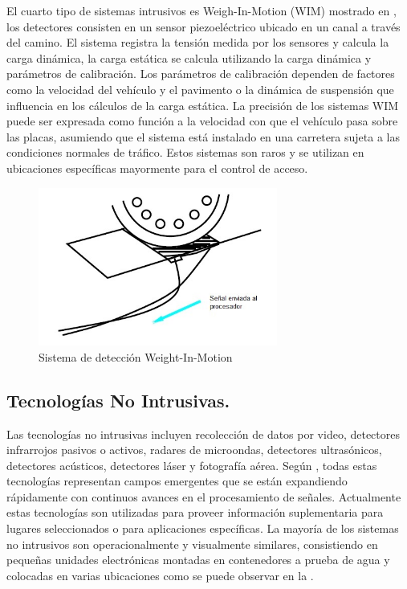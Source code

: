 El cuarto tipo de sistemas intrusivos es Weigh-In-Motion (WIM) mostrado en , los detectores consisten en un sensor piezoeléctrico ubicado en un canal a través del camino. El sistema registra la tensión medida por los sensores y calcula la carga dinámica, la carga estática se calcula utilizando la carga dinámica y parámetros de calibración. Los parámetros de calibración dependen de factores como la velocidad del vehículo y el pavimento o la dinámica de suspensión que influencia en los cálculos de la carga estática. La precisión de los sistemas WIM puede ser expresada como función a la velocidad con que el vehículo pasa sobre las placas, asumiendo que el sistema está instalado en una carretera sujeta a las condiciones normales de tráfico. Estos sistemas son raros y se utilizan en ubicaciones específicas mayormente para el control de acceso.

\begin{figure}[h]
	\centering
	\includegraphics[width=0.7\textwidth]{capitulos/3/figuras/figura2.jpg}
	\caption{\label{fig:Weight-In-Motion}  Sistema de detección Weight-In-Motion}	
\end{figure}

\subsection{Tecnologías No Intrusivas.}

Las tecnologías no intrusivas incluyen recolección de datos por video, detectores infrarrojos pasivos o activos, radares de microondas, detectores ultrasónicos, detectores acústicos, detectores láser y fotografía aérea. Según \cite{mathew2014transportation}, todas estas tecnologías representan campos emergentes que se están expandiendo rápidamente con continuos avances en el procesamiento de señales. Actualmente estas tecnologías son utilizadas para proveer información suplementaria para lugares seleccionados o para aplicaciones específicas. La mayoría de los sistemas no intrusivos son operacionalmente y visualmente similares, consistiendo en pequeñas unidades electrónicas montadas en contenedores a prueba de agua y colocadas en varias ubicaciones como se puede observar en la .

